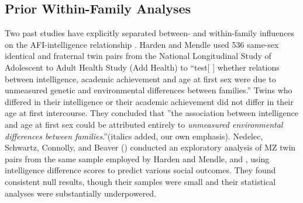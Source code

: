\subsection{Prior Within-Family Analyses} Two past studies have explicitly separated between- and within-family influences on the AFI-intelligence relationship \citep{harden2011don,nedelec2012exploring}. Harden and Mendle used 536 same-sex identical and fraternal twin pairs from the National Longitudinal Study of Adolescent to Adult Health Study (Add Health) to ``test[ ] whether relations between intelligence, academic achievement and age at first sex were due to unmeasured genetic and environmental differences between families.'' Twins who differed in their intelligence or their academic achievement did not differ in their age at first intercourse. They concluded that ''the association between intelligence and age at first sex could be attributed entirely to \textit{unmeasured environmental differences between families}.''(italics added, our own emphasis). Nedelec, Schwartz, Connolly, and Beaver (\citeyear{nedelec2012exploring}) conducted an exploratory analysis of MZ twin pairs from the same sample employed by Harden and Mendle, and \citet{halpern2000smart}, using intelligence difference scores to predict various social outcomes. They found consistent null results, though their samples were small and their statistical analyses were substantially underpowered.
